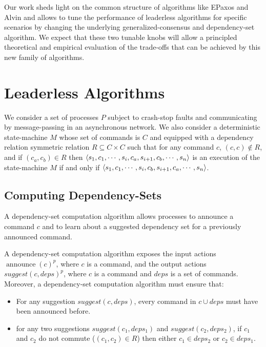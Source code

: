 Our work sheds light on the common structure of algorithms like EPaxos and Alvin and allows to tune the performance of leaderless algorithms for specific scenarios by changing the underlying generalized-consensus and dependency-set algorithm. 
We expect that these two tunable knobs will allow a principled theoretical and empirical evaluation of the trade-offs that can be achieved by this new family of algorithms.

\section{Leaderless Algorithms}

We consider a set of processes $P$ subject to crash-stop faults and communicating by message-passing in an asynchronous network.
We also consider a deterministic state-machine $M$ whose set of commands is $C$ and equipped with a dependency relation symmetric relation $R \subseteq C\times C$ such that for any command $c$, $\left( c,c \right)\notin R$, and if $\left( c_a,c_b \right)\in R$ then $\left\langle s_1,c_1,\cdots,s_i,c_a,s_{i+1},c_b,\cdots,s_n\right\rangle$ is an execution of the state-machine $M$ if and only if
$\left\langle s_1,c_1,\cdots,s_i,c_b,s_{i+1},c_a,\cdots,s_n\right\rangle$.

\subsection{Computing Dependency-Sets}

A dependency-set computation algorithm allows processes to announce a command $c$ and to learn about a suggested dependency set for a previously announced command.

A dependency-set computation algorithm exposes the input actions ${\operatorname{announce}\left( c \right)}^p$, where $c$ is a command, and the output actions ${suggest\left( c, deps \right)}^p$, where $c$ is a command and $deps$ is a set of commands.
Moreover, a dependency-set computation algorithm must ensure that:
\begin{itemize}[noitemsep,nolistsep]
    \item For any suggestion ${suggest\left( c, deps \right)}$, every command in $c\cup deps$ must have been announced before.
    \item for any two suggestions $suggest\left( c_1, deps_1 \right)$ and $suggest\left( c_2, deps_2 \right)$,  if $c_1$ and $c_2$ do not commute ($\left( c_1,c_2 \right) \in R$) then either $c_1\in deps_2$ or $c_2 \in deps_1$.
\end{itemize}

